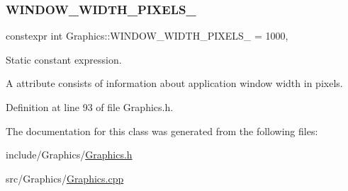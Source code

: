 \subsubsection{\texorpdfstring{W\+I\+N\+D\+O\+W\+\_\+\+W\+I\+D\+T\+H\+\_\+\+P\+I\+X\+E\+L\+S\+\_\+}{WINDOW\_WIDTH\_PIXELS\_}}
{\footnotesize\ttfamily constexpr int Graphics\+::\+W\+I\+N\+D\+O\+W\+\_\+\+W\+I\+D\+T\+H\+\_\+\+P\+I\+X\+E\+L\+S\+\_\+ = 1000\hspace{0.3cm}{\ttfamily [static]}, {\ttfamily [private]}}



Static constant expression. 

A attribute consists of information about application window width in pixels. 

Definition at line 93 of file Graphics.\+h.



The documentation for this class was generated from the following files\+:\begin{DoxyCompactItemize}
\item 
include/\+Graphics/\hyperlink{Graphics_8h}{Graphics.\+h}\item 
src/\+Graphics/\hyperlink{Graphics_8cpp}{Graphics.\+cpp}\end{DoxyCompactItemize}
